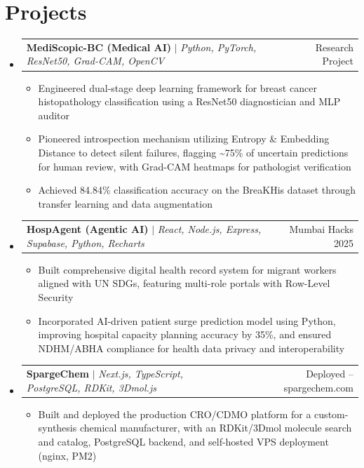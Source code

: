 \documentclass[letterpaper,10pt]{article}
\makeatletter
\newcommand{\resumeItem}[1]{
  \item\small{
    {#1 \vspace{-2pt}}
  }
}
\newcommand{\resumeProjectHeading}[2]{
    \item
    \begin{tabular*}{0.97\textwidth}{l@{\extracolsep{\fill}}r}
      \small#1 & #2 \\
    \end{tabular*}\vspace{-7pt}
}
\newcommand{\resumeSubHeadingListStart}{\begin{itemize}[leftmargin=0.15in, label={}]}
\newcommand{\resumeSubHeadingListEnd}{\end{itemize}}
\newcommand{\resumeItemListStart}{\begin{itemize}[leftmargin=0.15in, itemsep=1pt, topsep=2pt]}
\newcommand{\resumeItemListEnd}{\end{itemize}\vspace{-5pt}}
\makeatother
\begin{document}
\section{Projects}
    \resumeSubHeadingListStart
      \resumeProjectHeading
          {\textbf{MediScopic-BC (Medical AI)} $|$ \emph{Python, PyTorch, ResNet50, Grad-CAM, OpenCV}}{Research Project}
          \resumeItemListStart
            \resumeItem{Engineered dual-stage deep learning framework for breast cancer histopathology classification using a ResNet50 diagnostician and MLP auditor}
            \resumeItem{Pioneered introspection mechanism utilizing Entropy \& Embedding Distance to detect silent failures, flagging \textasciitilde75\% of uncertain predictions for human review, with Grad-CAM heatmaps for pathologist verification}
            \resumeItem{Achieved 84.84\% classification accuracy on the BreaKHis dataset through transfer learning and data augmentation}
          \resumeItemListEnd
      \resumeProjectHeading
          {\textbf{HospAgent (Agentic AI)} $|$ \emph{React, Node.js, Express, Supabase, Python, Recharts}}{Mumbai Hacks 2025}
          \resumeItemListStart
            \resumeItem{Built comprehensive digital health record system for migrant workers aligned with UN SDGs, featuring multi-role portals with Row-Level Security}
            \resumeItem{Incorporated AI-driven patient surge prediction model using Python, improving hospital capacity planning accuracy by 35\%, and ensured NDHM/ABHA compliance for health data privacy and interoperability}
          \resumeItemListEnd
      \resumeProjectHeading
          {\textbf{SpargeChem} $|$ \emph{Next.js, TypeScript, PostgreSQL, RDKit, 3Dmol.js}}{Deployed -- spargechem.com}
          \resumeItemListStart
            \resumeItem{Built and deployed the production CRO/CDMO platform for a custom-synthesis chemical manufacturer, with an RDKit/3Dmol molecule search and catalog, PostgreSQL backend, and self-hosted VPS deployment (nginx, PM2)}
          \resumeItemListEnd
    \resumeSubHeadingListEnd

\end{document}
